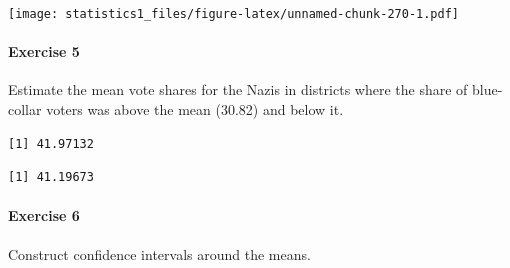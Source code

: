 \documentclass[]{article}
\newenvironment{Shaded}{\begin{snugshade}}{\end{snugshade}}
\newcommand{\KeywordTok}[1]{\textcolor[rgb]{0.13,0.29,0.53}{\textbf{#1}}}
\newcommand{\StringTok}[1]{\textcolor[rgb]{0.31,0.60,0.02}{#1}}
\newcommand{\CommentTok}[1]{\textcolor[rgb]{0.56,0.35,0.01}{\textit{#1}}}
\newcommand{\OperatorTok}[1]{\textcolor[rgb]{0.81,0.36,0.00}{\textbf{#1}}}
\newcommand{\NormalTok}[1]{#1}
\let\oldparagraph\paragraph
\renewcommand{\paragraph}[1]{\oldparagraph{#1}\mbox{}}
\theoremstyle{definition}
\theoremstyle{definition}
\theoremstyle{definition}
\theoremstyle{remark}
\begin{document}
\texttt{[image: statistics1\_files/figure-latex/unnamed-chunk-270-1.pdf]}

\paragraph{Exercise 5}\label{exercise-5-4}

Estimate the mean vote shares for the Nazis in districts where the share
of blue-collar voters was above the mean (30.82) and below it.

\begin{Shaded}
\end{Shaded}

\begin{verbatim}
[1] 41.97132
\end{verbatim}

\begin{Shaded}
\end{Shaded}

\begin{verbatim}
[1] 41.19673
\end{verbatim}

\paragraph{Exercise 6}\label{exercise-6-4}

Construct confidence intervals around the means.
\end{document}
